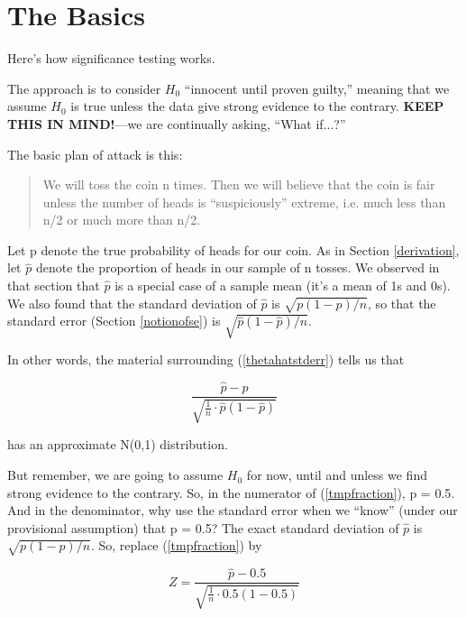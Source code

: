 \section{The Basics}
\label{sigtests}

Here's how significance testing works.

The approach is to consider $H_0$ ``innocent until proven guilty,''
meaning that we assume $H_0$ is true unless the data give strong
evidence to the contrary.  {\bf KEEP THIS IN MIND!}---we are continually
asking, ``What if...?''

The basic plan of attack is this:

\begin{quote}

We will toss the coin n times.  Then we will believe that the coin is
fair unless the number of heads is ``suspiciously'' extreme, i.e. much
less than n/2 or much more than n/2.

\end{quote}

Let p denote the true probability of heads for our coin.  As in Section
\ref{derivation}, let $\widehat{p}$ denote the proportion of heads in
our sample of n tosses.  We observed in that section that $\widehat{p}$
is a special case of a sample mean (it's a mean of 1s and 0s).  We also
found that the standard deviation of $\widehat{p}$ is $\sqrt{p (1 -
p)/n}$, so that the standard error (Section \ref{notionofse}) is 
$\sqrt{\widehat{p} (1-\widehat{p}) / n }$.

In other words, the material surrounding (\ref{thetahatstderr})
tells us that 

\begin{equation}
\label{tmpfraction}
\frac{\widehat{p}-p}
{\sqrt{
\frac{1}{n} 
\cdot \widehat{p} (1-\widehat{p})
}
} 
\end{equation}

has an approximate N(0,1) distribution.

But remember, we are going to assume $H_0$ for now, until and unless we
find strong evidence to the contrary.  So, in the numerator of
(\ref{tmpfraction}), p = 0.5.  And in the denominator, why use the
standard error when we ``know'' (under our provisional assumption) that
p = 0.5?  The exact standard deviation of $\widehat{p}$ is $\sqrt{p
(1-p)/ n}$. So, replace (\ref{tmpfraction}) by

\begin{equation}
\label{pz}
Z = \frac{\widehat{p}-0.5}{\sqrt{\frac{1}{n} \cdot 0.5(1-0.5)}} 
\end{equation}

